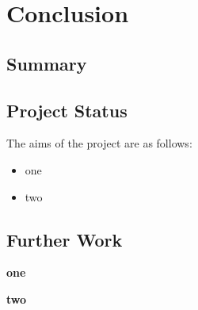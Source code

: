 \documentclass[ %
                    author={Louis Wang},
                supervisor={Dr. Qiang Liu},
                    degree={MSc},
                     title={Identification of Suicide Ideation in Texts},
                      type={},
                      year={2024}]{dissertation}
\begin{document}

\chapter{Conclusion}
\label{chap:conclusion}

\section{Summary}

\noindent

\section{Project Status}

\noindent
The aims of the project are as follows:

\begin{itemize}
      \item one
      \item two
\end{itemize}

\section{Further Work}

\noindent

\textbf{one}

\textbf{two}



%
%

\backmatter



\end{document}
